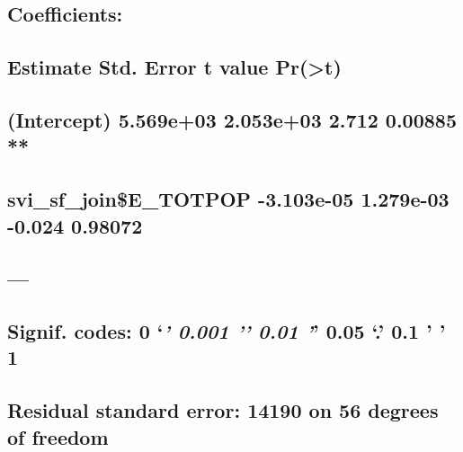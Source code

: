 \documentclass[
  12pt,
]{article}
\begin{document}
\hypertarget{coefficients-2}{%
\subsection{Coefficients:}\label{coefficients-2}}

\hypertarget{estimate-std.-error-t-value-prt-2}{%
\subsection{Estimate Std. Error t value
Pr(\textgreater\textbar t\textbar)}\label{estimate-std.-error-t-value-prt-2}}

\hypertarget{intercept-5.569e03-2.053e03-2.712-0.00885}{%
\subsection{(Intercept) 5.569e+03 2.053e+03 2.712 0.00885
**}\label{intercept-5.569e03-2.053e03-2.712-0.00885}}

\hypertarget{svi_sf_joine_totpop--3.103e-05-1.279e-03--0.024-0.98072}{%
\subsection{svi\_sf\_join\$E\_TOTPOP -3.103e-05 1.279e-03 -0.024
0.98072}\label{svi_sf_joine_totpop--3.103e-05-1.279e-03--0.024-0.98072}}

\hypertarget{section-28}{%
\subsection{---}\label{section-28}}

\hypertarget{signif.-codes-0-0.001-0.01-0.05-.-0.1-1-2}{%
\subsection{\texorpdfstring{Signif. codes: 0 `\emph{\textbf{' 0.001 '}'
0.01 '}' 0.05 `.' 0.1 ' '
1}{Signif. codes: 0 `\,' 0.001 '\,' 0.01 '\,' 0.05 `.' 0.1 ' ' 1}}\label{signif.-codes-0-0.001-0.01-0.05-.-0.1-1-2}}

\hypertarget{section-29}{%
\subsection{}\label{section-29}}

\hypertarget{residual-standard-error-14190-on-56-degrees-of-freedom}{%
\subsection{Residual standard error: 14190 on 56 degrees of
freedom}\label{residual-standard-error-14190-on-56-degrees-of-freedom}}
\end{document}
